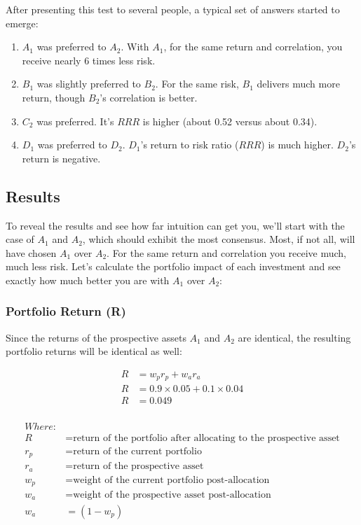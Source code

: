\documentclass[]{article}
\providecommand{\tightlist}{%
  \setlength{\itemsep}{0pt}\setlength{\parskip}{0pt}}
\begin{document}
After presenting this test to several people, a typical set of answers
started to emerge:

\begin{enumerate}
\def\labelenumi{\arabic{enumi}.}
\tightlist
\item
  \(A_1\) was preferred to \(A_2\). With \(A_1\), for the same return
  and correlation, you receive nearly 6 times less risk.
\item
  \(B_1\) was slightly preferred to \(B_2\). For the same risk, \(B_1\)
  delivers much more return, though \(B_2\)'s correlation is better.
\item
  \(C_2\) was preferred. It's \(RRR\) is higher (about 0.52 versus about
  0.34).
\item
  \(D_1\) was preferred to \(D_2\). \(D_1\)'s return to risk ratio
  (\(RRR\)) is much higher. \(D_2\)'s return is negative.
\end{enumerate}

\hypertarget{results}{%
\subsection{Results}\label{results}}

To reveal the results and see how far intuition can get you, we'll start
with the case of \(A_1\) and \(A_2\), which should exhibit the most
consensus. Most, if not all, will have chosen \(A_1\) over \(A_2\). For
the same return and correlation you receive much, much less risk. Let's
calculate the portfolio impact of each investment and see exactly how
much better you are with \(A_1\) over \(A_2\):

\hypertarget{portfolio-return-r}{%
\subsubsection{Portfolio Return (R)}\label{portfolio-return-r}}

Since the returns of the prospective assets \(A_1\) and \(A_2\) are
identical, the resulting portfolio returns will be identical as well:

\[
\begin{aligned}
R & = w_p r_p + w_a r_a \\
R & = 0.9 \times 0.05 + 0.1 \times 0.04 \\
R & = 0.049 \\
\end{aligned}
\]

\[
\begin{aligned}
Where: & \\
R & = \text{return of the portfolio after allocating to the prospective asset} \\
r_p & = \text{return of the current portfolio} \\
r_a & = \text{return of the prospective asset} \\
w_p & = \text{weight of the current portfolio post-allocation} \\
w_a & = \text{weight of the prospective asset post-allocation} \\
w_a & = (1 - w_p)
\end{aligned}
\]
\end{document}
